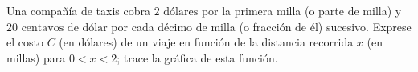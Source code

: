 \item Una compañía de taxis cobra $2\text{ dólares}$ por la primera milla (o parte de milla) y $20\text{ centavos de dólar}$ por cada décimo de milla (o fracción de él) sucesivo. Exprese el costo $C$ (en dólares) de un viaje en función de la distancia recorrida $x$ (en millas) para $0 < x < 2$; trace la gráfica de esta función.
